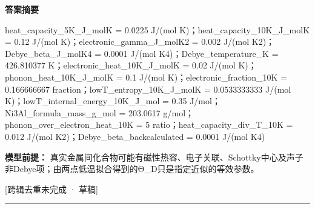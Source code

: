 \documentclass[UTF8,11pt,a4paper]{ctexart}
\begin{document}
\noindent\textbf{答案摘要}\par
heat\_capacity\_5K\_J\_molK = 0.0225 J/(mol K)；heat\_capacity\_10K\_J\_molK = 0.12 J/(mol K)；electronic\_gamma\_J\_molK2 = 0.002 J/(mol K2)；Debye\_beta\_J\_molK4 = 0.0001 J/(mol K4)；Debye\_temperature\_K = 426.810377 K；electronic\_heat\_10K\_J\_molK = 0.02 J/(mol K)；phonon\_heat\_10K\_J\_molK = 0.1 J/(mol K)；electronic\_fraction\_10K = 0.166666667 fraction；lowT\_entropy\_10K\_J\_molK = 0.0533333333 J/(mol K)；lowT\_internal\_energy\_10K\_J\_mol = 0.35 J/mol；Ni3Al\_formula\_mass\_g\_mol = 203.0617 g/mol；phonon\_over\_electron\_heat\_10K = 5 ratio；heat\_capacity\_div\_T\_10K = 0.012 J/(mol K2)；Debye\_beta\_backcalculated = 0.0001 J/(mol K4)\par
\noindent\textbf{模型前提：}
真实金属间化合物可能有磁性热容、电子关联、Schottky中心及声子非Debye项；由两点低温拟合得到的Θ\_D只是指定近似的等效参数。\par
\noindent\textcolor{red!65!black}{[跨辑去重未完成 · 草稿]} \par
\medskip\hrule\medskip
{}
\end{document}
